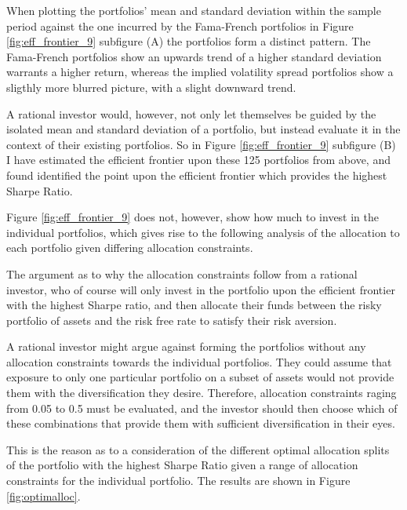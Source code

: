 When plotting the portfolios' mean and standard deviation within the sample period against the one incurred by the Fama-French portfolios in Figure \ref{fig:eff_frontier_9} subfigure (A) the portfolios form a distinct pattern. The Fama-French portfolios show an upwards trend of a higher standard deviation warrants a higher return, whereas the implied volatility spread portfolios show a sligthly more blurred picture, with a slight downward trend. 

A rational investor  would, however, not only let themselves be guided by the isolated mean and standard deviation of a portfolio, but instead evaluate it in the context of their existing portfolios. So in Figure \ref{fig:eff_frontier_9} subfigure (B) I have estimated the efficient frontier upon these 125 portfolios from above, and found identified the point upon the efficient frontier which provides the highest Sharpe Ratio. 

Figure \ref{fig:eff_frontier_9} does not, however, show how much to invest in the individual portfolios, which gives rise to the following analysis of the allocation to each portfolio given differing allocation constraints. 

The argument as to why the allocation constraints follow from a rational investor, who of course will only invest in the portfolio upon the efficient frontier with the highest Sharpe ratio, and then allocate their funds between the risky portfolio of assets and the risk free rate to satisfy their risk aversion. 

A rational investor might argue against forming the portfolios without any allocation constraints towards the individual portfolios. They could assume that exposure to only one particular portfolio on a subset of assets would not provide them with the diversification they desire. Therefore, allocation constraints raging from 0.05 to 0.5 must be evaluated, and the investor should then choose which of these combinations that provide them with sufficient diversification in their eyes. 

This is the reason as to a consideration of the different optimal allocation splits of the portfolio with the highest Sharpe Ratio given a range of allocation constraints for the individual portfolio. The results are shown in Figure \ref{fig:optimalloc}. 

